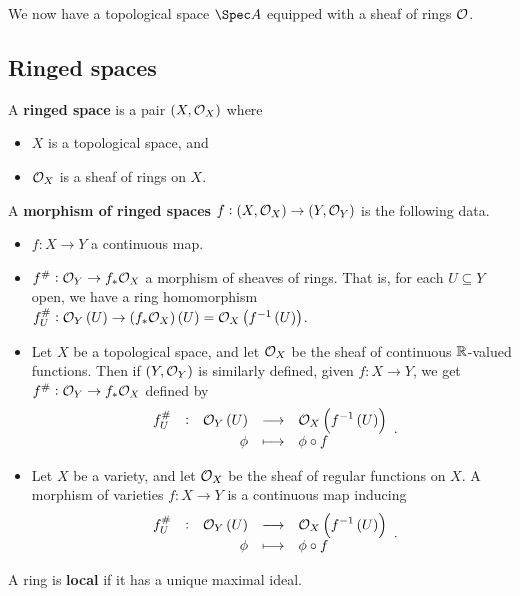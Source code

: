 We now have a topological space $ \Spec A $ equipped with a sheaf of rings $ \mathcal{O} $.

\subsection{Ringed spaces}

\begin{definition*}
A \textbf{ringed space} is a pair $ \br{X, \OOO_X} $ where
\begin{itemize}
\item $ X $ is a topological space, and
\item $ \mathcal{O}_X $ is a sheaf of rings on $ X $.
\end{itemize}
A \textbf{morphism of ringed spaces} $ f : \br{X, \OOO_X} \to \br{Y, \OOO_Y} $ is the following data.
\begin{itemize}
\item $ f : X \to Y $ a continuous map.
\item $ f^\# : \mathcal{O}_Y \to f_*\mathcal{O}_X $ a morphism of sheaves of rings. That is, for each $ U \subseteq Y $ open, we have a ring homomorphism $ f_U^\# : \OOO_Y\br{U} \to \br{f_*\OOO_X}\br{U} = \OOO_X\br{f^{-1}\br{U}} $.
\end{itemize}
\end{definition*}

\pagebreak

\begin{example*}
\hfill
\begin{itemize}
\item Let $ X $ be a topological space, and let $ \mathcal{O}_X $ be the sheaf of continuous $ \mathbb{R} $-valued functions. Then if $ \br{Y, \OOO_Y} $ is similarly defined, given $ f : X \to Y $, we get $ f^\# : \mathcal{O}_Y \to f_*\mathcal{O}_X $ defined by
$$ \function[f_U^\#]{\OOO_Y\br{U}}{\OOO_X\br{f^{-1}\br{U}}}{\phi}{\phi \circ f}. $$
\item Let $ X $ be a variety, and let $ \mathcal{O}_X $ be the sheaf of regular functions on $ X $. A morphism of varieties $ f : X \to Y $ is a continuous map inducing
$$ \function[f_U^\#]{\OOO_Y\br{U}}{\OOO_X\br{f^{-1}\br{U}}}{\phi}{\phi \circ f}. $$
\end{itemize}
\end{example*}

A ring is \textbf{local} if it has a unique maximal ideal.

